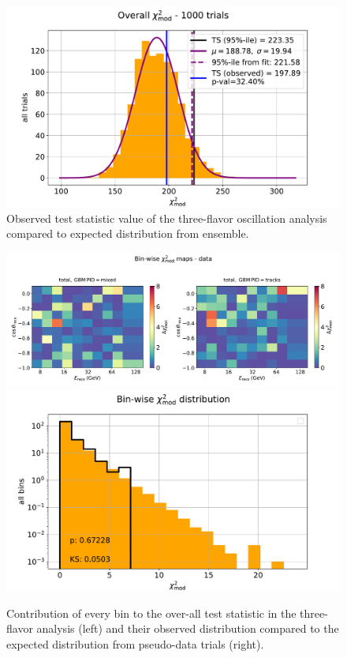 \begin{figure}
    \centering
    \includegraphics[width=0.8\linewidth]{figures/measurement/three_flavor/ensemble_pre_fit/overall_ts_wings_trials.pdf}
    \caption{Observed test statistic value of the three-flavor oscillation analysis compared to expected distribution from ensemble.}
    \label{fig:three-flavor-ts-ensemble}
\end{figure}

\begin{figure}
    \centering
    \includegraphics[height=0.22\linewidth]{figures/measurement/three_flavor/ensemble_pre_fit/real_fit_binwise_pulls_pre_bugfix.pdf}
    \includegraphics[height=0.22\linewidth]{figures/measurement/three_flavor/ensemble_pre_fit/binwise_ts_wings_trials.pdf}
    \caption{Contribution of every bin to the over-all test statistic in the three-flavor analysis (left) and their observed distribution compared to the expected distribution from pseudo-data trials (right).}
    \label{fig:three-flavor-binwise-ts}
\end{figure}

